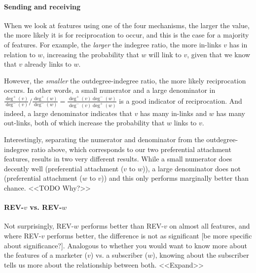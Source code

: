 \documentclass[conference]{IEEEtran}
\begin{document}
\paragraph{Sending and receiving}
When we look at features using one of the four mechanisms, the larger the value, the more likely it is for reciprocation to occur, and this is the case for a majority of features. 
For example, the \emph{larger} the indegree ratio, the more in-links $v$ has in relation to $w$, increasing the probability that $w$ will link to $v$, given that we know that $v$ already links to $w$.

However, the \emph{smaller} the outdegree-indegree ratio, the more likely reciprocation occurs. 
In other words, a small numerator and a large denominator in $\frac{\deg^+(v)}{\deg^-(v)} / \frac{\deg^+(w)}{\deg^-(w)} = \frac{\deg^+(v)\deg^-(w)}{\deg^-(v)\deg^+(w)}$ is a good indicator of reciprocation. 
And indeed, a large denominator indicates that $v$ has many in-links and $w$ has many out-links, both of which increase the probability that $w$ links to $v$.

Interestingly, separating the numerator and denominator from the outdegree-indegree ratio above, which corresponds to our two preferential attachment features, results in two very different results. 
While a small numerator does decently well (preferential attachment ($v$ to $w$)), a large denominator does not (preferential attachment ($w$ to $v$)) and this only performs marginally better than chance. <<TODO Why?>>

\paragraph{REV-$v$ vs. REV-$w$}
Not surprisingly, REV-$w$ performs better than REV-$v$ on almost all features, and where REV-$v$ performs better, the difference is not as significant [be more specific about significance?]. 
Analogous to whether you would want to know more about the features of a marketer ($v$) vs. a subscriber ($w$), knowing about the subscriber tells us more about the relationship between both. <<Expand>>
\end{document}

